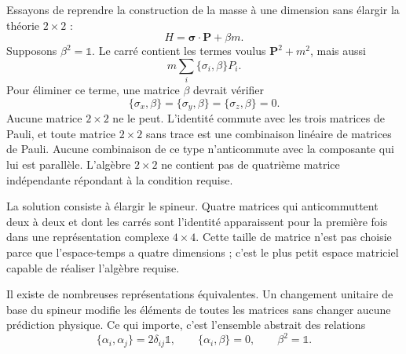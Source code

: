 Essayons de reprendre la construction de la masse à une dimension sans élargir la théorie \(2\times2\) :
\begin{equation}
H=\boldsymbol{\sigma}\cdot\mathbf P+\beta m.
\label{eq:l10-failed-mass}
\end{equation}
Supposons \(\beta^2=\mathbb{1}\). Le carré contient les termes voulus \(\mathbf P^2+m^2\), mais aussi
\begin{equation}
m\sum_i\{\sigma_i,\beta\}P_i.
\end{equation}
Pour éliminer ce terme, une matrice \(\beta\) devrait vérifier
\begin{equation}
\{\sigma_x,\beta\}
=
\{\sigma_y,\beta\}
=
\{\sigma_z,\beta\}
=0.
\label{eq:l10-impossible-beta}
\end{equation}
Aucune matrice \(2\times2\) ne le peut. L’identité commute avec les trois matrices de Pauli, et toute matrice \(2\times2\) sans trace est une combinaison linéaire de matrices de Pauli. Aucune combinaison de ce type n’anticommute avec la composante qui lui est parallèle. L’algèbre \(2\times2\) ne contient pas de quatrième matrice indépendante répondant à la condition requise.

La solution consiste à élargir le spineur. Quatre matrices qui anticommuttent deux à deux et dont les carrés sont l’identité apparaissent pour la première fois dans une représentation complexe \(4\times4\). Cette taille de matrice n’est pas choisie parce que l’espace-temps a quatre dimensions ; c’est le plus petit espace matriciel capable de réaliser l’algèbre requise.

Il existe de nombreuses représentations équivalentes. Un changement unitaire de base du spineur modifie les éléments de toutes les matrices sans changer aucune prédiction physique. Ce qui importe, c’est l’ensemble abstrait des relations
\begin{equation}
\{\alpha_i,\alpha_j\}=2\delta_{ij}\mathbb{1},
\qquad
\{\alpha_i,\beta\}=0,
\qquad
\beta^2=\mathbb{1}.
\label{eq:l10-dirac-algebra}
\end{equation}

\begin{classroomqa}
\end{classroomqa}

